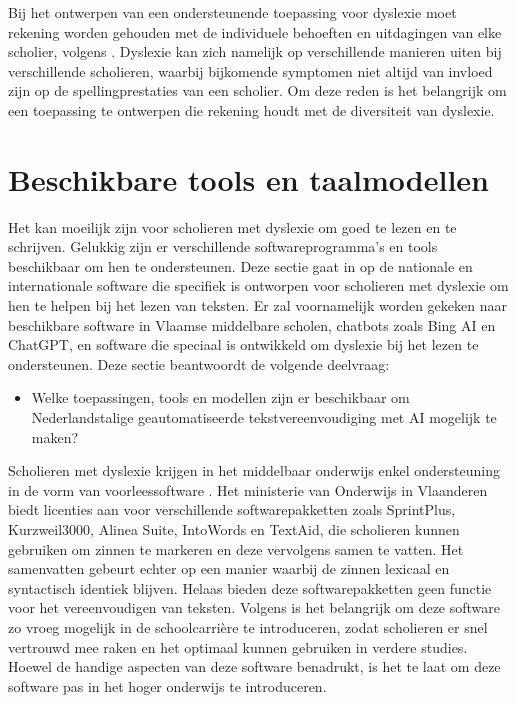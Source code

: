 Bij het ontwerpen van een ondersteunende toepassing voor dyslexie moet rekening worden gehouden met de individuele behoeften en uitdagingen van elke scholier, volgens \textcite{Gooding2022}. Dyslexie kan zich namelijk op verschillende manieren uiten bij verschillende scholieren, waarbij bijkomende symptomen niet altijd van invloed zijn op de spellingprestaties van een scholier. Om deze reden is het belangrijk om een toepassing te ontwerpen die rekening houdt met de diversiteit van dyslexie.

\section{Beschikbare tools en taalmodellen}
\label{sec:beschikbare-tools-en-taalmodellen}

Het kan moeilijk zijn voor scholieren met dyslexie om goed te lezen en te schrijven. Gelukkig zijn er verschillende softwareprogramma's en tools beschikbaar om hen te ondersteunen. Deze sectie gaat in op de nationale en internationale software die specifiek is ontworpen voor scholieren met dyslexie om hen te helpen bij het lezen van teksten.  Er zal voornamelijk worden gekeken naar beschikbare software in Vlaamse middelbare scholen, chatbots zoals Bing AI en ChatGPT, en software die speciaal is ontwikkeld om dyslexie bij het lezen te ondersteunen. Deze sectie beantwoordt de volgende deelvraag: 

\begin{itemize}
	\item Welke toepassingen, tools en modellen zijn er beschikbaar om Nederlandstalige geautomatiseerde tekstvereenvoudiging met AI mogelijk te maken?
\end{itemize}

\medspace

Scholieren met dyslexie krijgen in het middelbaar onderwijs enkel ondersteuning in de vorm van voorleessoftware \autocite{DeCraemer2018, OnderwijsVlaanderen2023}. Het ministerie van Onderwijs in Vlaanderen biedt licenties aan voor verschillende softwarepakketten zoals SprintPlus, Kurzweil3000, Alinea Suite, IntoWords en TextAid, die scholieren kunnen gebruiken om zinnen te markeren en deze vervolgens samen te vatten. Het samenvatten gebeurt echter op een manier waarbij de zinnen lexicaal en syntactisch identiek blijven. Helaas bieden deze softwarepakketten geen functie voor het vereenvoudigen van teksten. Volgens \textcite{Tops2018} is het belangrijk om deze software zo vroeg mogelijk in de schoolcarrière te introduceren, zodat scholieren er snel vertrouwd mee raken en het optimaal kunnen gebruiken in verdere studies. Hoewel \textcite{Tops2018} de handige aspecten van deze software benadrukt, is het te laat om deze software pas in het hoger onderwijs te introduceren.

